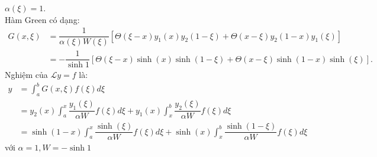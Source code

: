 \documentclass{article}
\newcommand{\f}[2]{\dfrac{#1}{#2}}
\begin{document}
$\alpha(\xi) = 1$.\\
Hàm Green có dạng:
\begin{align}
	G(x,\xi) & = \f{1}{\alpha(\xi) W(\xi)}\left[ \Theta(\xi - x) y_1(x) y_2(1-\xi) + \Theta(x - \xi) y_2(1-x) y_1(\xi) \right] \nonumber \\
	         & = -\f{1}{\sinh 1}\left[ \Theta(\xi - x) \sinh(x) \sinh(1-\xi) + \Theta(x - \xi) \sinh(1-x) \sinh(\xi) \right]	.
\end{align}
Nghiệm của $\mathcal{L}y = f$ là:
\begin{align}
	y & = \int_a^b G(x,\xi) f(\xi) d\xi \nonumber                                                                               \\
	  & = y_2(x) \int_a^x \f{y_1(\xi)}{\alpha W}f(\xi) d\xi + y_1(x) \int_x^b \f{y_2(\xi)}{\alpha W}f(\xi) d\xi \nonumber       \\
	  & = \sinh (1-x) \int_a^x \f{\sinh (\xi)}{\alpha W}f(\xi) d\xi + \sinh (x) \int_x^b \f{\sinh (1-\xi)}{\alpha W}f(\xi) d\xi
\end{align}
với $\alpha = 1, W = -\sinh 1$
\end{document}
